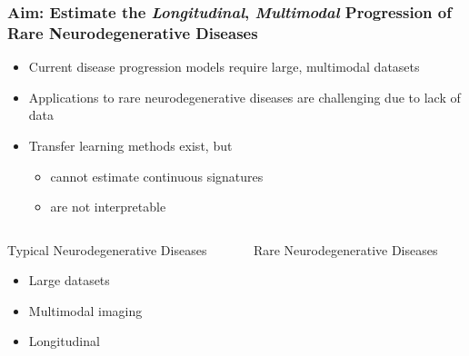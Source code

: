 \documentclass[8pt,xcolor=table]{beamer}
\begin{document}
\begin{frame}[label=current]
\frametitle{Aim: Estimate the \emph{Longitudinal}, \emph{Multimodal} Progression of Rare Neurodegenerative Diseases}


\begin{itemize}
 \item Current disease progression models require large, multimodal datasets
 \item Applications to rare neurodegenerative diseases are challenging due to lack of data
 \item Transfer learning methods exist, but 
\begin{itemize}
\item cannot estimate continuous signatures
\item are not interpretable
\end{itemize}
\end{itemize}

 \begin{columns}[T]
  \begin{column}{.47\textwidth}
  
  \begin{center}
   
  Typical Neurodegenerative Diseases
  
  
 
  \begin{itemize}
   \item Large datasets \yes
   \item Multimodal imaging \yes
   \item Longitudinal \yes
  \end{itemize}

  \end{center}  
  \end{column}
  \hspace{-2em}
  \vrule{}
  \begin{column}{.47\textwidth}
  \begin{center}
    
  Rare Neurodegenerative Diseases
  

\end{center}
\end{column}
\end{columns}
\end{frame}
\end{document}
